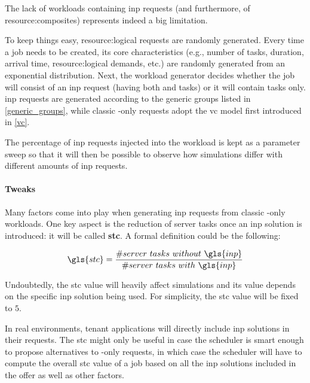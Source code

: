 The lack of workloads containing \gls{inp} requests (and furthermore, of \glspl{resource:composite}) represents indeed a big limitation.

To keep things easy, \gls{resource:logical} requests are randomly generated.
Every time a job needs to be created, its core characteristics (e.g., number of tasks, duration, arrival time, \gls{resource:logical} demands, etc.) are randomly generated from an exponential distribution.
Next, the workload generator decides whether the job will consist of an \gls{inp} request (having both  and  tasks) or it will contain  tasks only.
\gls{inp} requests are generated according to the generic groups listed in \autoref{generic_groups}, while classic -only requests adopt the \gls{vc} model first introduced in \autoref{vc}.

The percentage of \gls{inp} requests injected into the workload is kept as a parameter sweep so that it will then be possible to observe how simulations differ with different amounts of \gls{inp} requests.

\paragraph{Tweaks} \label{workload_tweaks}
Many factors come into play when generating \gls{inp} requests from classic -only workloads.
One key aspect is the reduction of server tasks once an \gls{inp} solution is introduced: it will be called \textbf{\gls{stc}}.
A formal definition could be the following:

\begin{equation}
\label{stc_formula}
\gls{stc}=\dfrac{\#server\ tasks\ without\ \gls{inp}}{\#server\ tasks\ with\ \gls{inp}}
\end{equation}

Undoubtedly, the \gls{stc} value will heavily affect simulations and its value depends on the specific \gls{inp} solution being used.
For simplicity, the \gls{stc} value will be fixed to $5$. %

In real environments, tenant applications will directly include \gls{inp} solutions in their requests.
The \gls{stc} might only be useful in case the scheduler is smart enough to propose alternatives to -only requests, in which case the scheduler will have to compute the overall \gls{stc} value of a job based on all the \gls{inp} solutions included in the offer as well as other factors.

